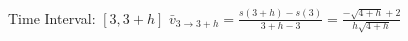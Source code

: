 {Time Interval: $[3,3+h]$}
{$\bar{v}_{3\to 3+h} = \frac{s(3+h)-s(3)}{3+h-3}=\frac{-\sqrt{4+h}+2}{h\sqrt{4+h}}$}